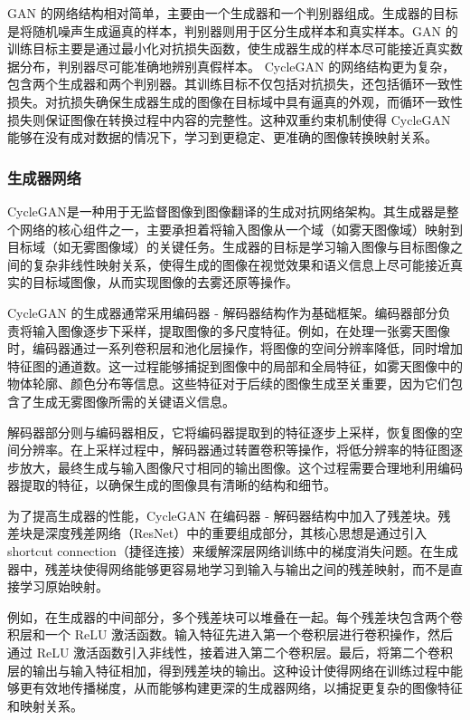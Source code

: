 GAN 的网络结构相对简单，主要由一个生成器和一个判别器组成。生成器的目标是将随机噪声生成逼真的样本，判别器则用于区分生成样本和真实样本。GAN 的训练目标主要是通过最小化对抗损失函数，使生成器生成的样本尽可能接近真实数据分布，判别器尽可能准确地辨别真假样本。
CycleGAN 的网络结构更为复杂，包含两个生成器和两个判别器。其训练目标不仅包括对抗损失，还包括循环一致性损失。对抗损失确保生成器生成的图像在目标域中具有逼真的外观，而循环一致性损失则保证图像在转换过程中内容的完整性。这种双重约束机制使得 CycleGAN 能够在没有成对数据的情况下，学习到更稳定、更准确的图像转换映射关系。

\subsubsection{生成器网络}


CycleGAN是一种用于无监督图像到图像翻译的生成对抗网络架构。其生成器是整个网络的核心组件之一，主要承担着将输入图像从一个域（如雾天图像域）映射到目标域（如无雾图像域）的关键任务。生成器的目标是学习输入图像与目标图像之间的复杂非线性映射关系，使得生成的图像在视觉效果和语义信息上尽可能接近真实的目标域图像，从而实现图像的去雾还原等操作。

CycleGAN 的生成器通常采用编码器 - 解码器结构作为基础框架。编码器部分负责将输入图像逐步下采样，提取图像的多尺度特征。例如，在处理一张雾天图像时，编码器通过一系列卷积层和池化层操作，将图像的空间分辨率降低，同时增加特征图的通道数。这一过程能够捕捉到图像中的局部和全局特征，如雾天图像中的物体轮廓、颜色分布等信息。这些特征对于后续的图像生成至关重要，因为它们包含了生成无雾图像所需的关键语义信息。

解码器部分则与编码器相反，它将编码器提取到的特征逐步上采样，恢复图像的空间分辨率。在上采样过程中，解码器通过转置卷积等操作，将低分辨率的特征图逐步放大，最终生成与输入图像尺寸相同的输出图像。这个过程需要合理地利用编码器提取的特征，以确保生成的图像具有清晰的结构和细节。



为了提高生成器的性能，CycleGAN 在编码器 - 解码器结构中加入了残差块。残差块是深度残差网络（ResNet）中的重要组成部分，其核心思想是通过引入 shortcut connection（捷径连接）来缓解深层网络训练中的梯度消失问题。在生成器中，残差块使得网络能够更容易地学习到输入与输出之间的残差映射，而不是直接学习原始映射。

例如，在生成器的中间部分，多个残差块可以堆叠在一起。每个残差块包含两个卷积层和一个 ReLU 激活函数。输入特征先进入第一个卷积层进行卷积操作，然后通过 ReLU 激活函数引入非线性，接着进入第二个卷积层。最后，将第二个卷积层的输出与输入特征相加，得到残差块的输出。这种设计使得网络在训练过程中能够更有效地传播梯度，从而能够构建更深的生成器网络，以捕捉更复杂的图像特征和映射关系。

